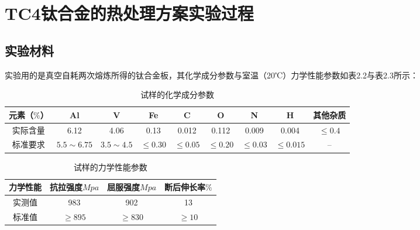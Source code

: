 \begin{table}[htbp]
\begin{tabular}{ccccccc}
	\bottomrule
\end{tabular}
\end{table}
\section{TC4钛合金的热处理方案实验过程}
\subsection{实验材料}
实验用的是真空自耗两次熔炼所得的钛合金板，其化学成分参数与室温（20℃）力学性能参数如表2.2与表2.3所示：
\begin{table}[htbp]
	\centering
	\label{sec:mytc4chem}
	\caption{试样的化学成分参数}
	\begin{tabular}{ccccccccc}
		\toprule
	元素（$ \% $） & Al & V &Fe &C& O& N &H &其他杂质\\ \midrule
	实际含量 & 6.12&4.06 &0.13 &0.012&0.112&0.009&0.004 &$ \le 0.4 $ \\
	标准要求 &$ 5.5\sim 6.75 $ & $ 3.5\sim 4.5 $&$ \le 0.30 $ & $ \le 0.05 $&$ \le 0.20 $&$ \le 0.03$ &$ \le 0.015 $  & -- \\ \bottomrule
	\end{tabular}
\end{table}

\begin{table}[htbp]
	\centering
	\label{sec:mytc4machin}
	\caption{试样的力学性能参数}
	\begin{tabular}{cccc}
		\toprule
		力学性能& 抗拉强度$Mpa  $& 屈服强度$ Mpa $&断后伸长率$ \% $\\ \midrule
		实测值 & 983 &902 & 13\\
		标准值 &$ \ge 895 $&$ \ge 830 $&$ \ge 10 $ \\ \bottomrule
	\end{tabular}
\end{table}



